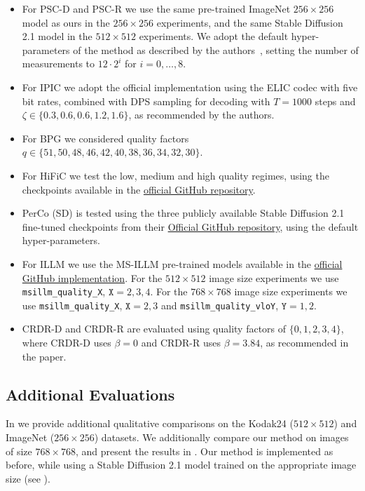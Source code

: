 \begin{itemize}[parsep=2pt,itemsep=2pt]
    \item For PSC-D and PSC-R we use the same pre-trained ImageNet $256\times256$ model as ours in the $256\times256$ experiments, and the same Stable Diffusion 2.1 model in the $512\times512$ experiments. We adopt the default hyper-parameters of the method as described by the authors~\citep{elata2024zero}, setting the number of measurements to $12\cdot2^i$ for $i=0,\ldots,8$.
    \item For IPIC we adopt the official implementation using the ELIC codec with five bit rates, combined with DPS sampling for decoding with $T=1000$ steps and $\zeta\in\{0.3, 0.6, 0.6, 1.2, 1.6\}$, as recommended by the authors.
    \item For BPG we considered quality factors $q\in\{51,50,48,46,42,40,38,36,34,32,30\}$. 
    \item For HiFiC we test the low, medium and high quality regimes, using the checkpoints available in the \href{https://github.com/Justin-Tan/high-fidelity-generative-compression}{official GitHub repository}.
    \item PerCo (SD) is tested using the three publicly available Stable Diffusion 2.1 fine-tuned checkpoints from their \href{https://github.com/Nikolai10/PerCo}{Official GitHub repository}, using the default hyper-parameters.
    \item For ILLM we use the MS-ILLM pre-trained models available in the \href{https://github.com/facebookresearch/NeuralCompression/tree/main/projects/illm}{official GitHub implementation}.
    For the $512\times512$ image size experiments we use \texttt{msillm\_quality\_X}, $\texttt{X}=2,3,4$. For the $768\times768$ image size experiments we use \texttt{msillm\_quality\_X}, $\texttt{X}=2,3$ and \texttt{msillm\_quality\_vloY}, $\texttt{Y}=1,2$.
    \item CRDR-D and CRDR-R are evaluated using quality factors of $\{0,1,2,3,4\}$, where CRDR-D uses $\beta=0$ and CRDR-R uses $\beta=3.84$, as recommended in the paper.
\end{itemize}


\subsection{Additional Evaluations}\label{app:compression_more_results}

In  we provide additional qualitative comparisons on the Kodak24 ($512\times 512$) and ImageNet ($256\times 256$) datasets.
We additionally compare our method on images of size $768\times768$, and present the results in .
Our method is implemented as before, while using a Stable Diffusion 2.1 model trained on the appropriate image size (see ).


